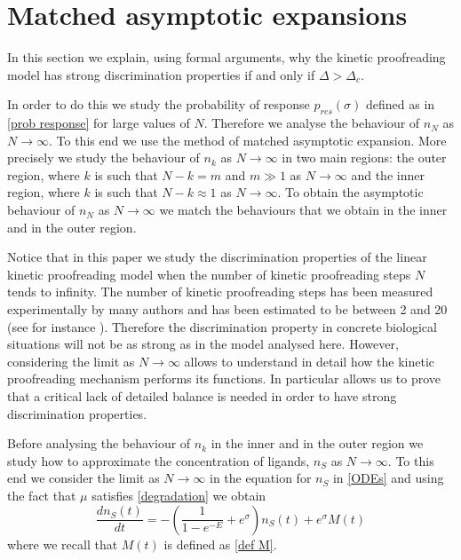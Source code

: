 \documentclass{article}
\numberwithin{equation}{section}
\theoremstyle{plain}
\begin{document}
\section{Matched asymptotic expansions} \label{sec:formal}
In this section we explain, using formal arguments, why the kinetic proofreading model has strong discrimination properties if and only if $\Delta > \Delta_c $. 


In order to do this we study the probability of response $p_{res} (\sigma) $ defined as in \eqref{prob response} for large values of $N$. 
Therefore we analyse the behaviour of
$n_{N} $ as $N \to \infty $.
To this end we use the method of matched asymptotic expansion. More precisely we study the behaviour of $n_k$ as $N \to \infty $ in two main regions: the outer region, where $k$ is such that $N- k=m$ and $m \gg 1 $ as $N \to \infty $ and the inner region, where $k$ is such that $N- k \approx 1 $ as $N \to \infty $.
To obtain the asymptotic behaviour of $n_{N} $ as $N \to \infty $ we match the behaviours that we obtain in the inner and in the outer region. 

Notice that in this paper we study the discrimination properties of the linear kinetic proofreading model when the number of kinetic proofreading steps $N$ tends to infinity. 
The number of kinetic proofreading steps has been measured experimentally by many authors and has been estimated to be between 2 and 20 (see for instance \cite{altan2005modeling,britain2022progressive,pettmann2021discriminatory,tischer2019light}). 
Therefore the discrimination property in concrete biological situations will not be as strong as in the model analysed here. However, considering the limit as $N \to \infty $ allows to understand in detail how the kinetic proofreading mechanism performs its functions. In particular allows us to prove that a critical lack of detailed balance is needed in order to have strong discrimination properties. 
 



Before analysing the behaviour of $n_k $ in the inner and in the outer region we study how to approximate the concentration of ligands, $n_S$ as $N \to \infty $. To this end we consider the limit as $N \to \infty$ in the equation for $n_S $ in \eqref{ODEs} and using the fact that $\mu $ satisfies \eqref{degradation} we obtain  
\[
\frac{d n_S(t) }{dt} = - \left( \frac{1}{1- e^{- E }} + e^\sigma \right) n_S(t) + e^{\sigma }  M(t)
\] 
where we recall that $M(t) $ is defined as \eqref{def M}. 
\end{document}
